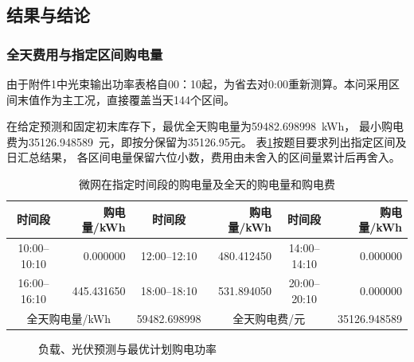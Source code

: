 \documentclass[UTF8,a4paper,12pt]{ctexart}
\newcommand{\Cost}{35126.948589}
\newcommand{\GridTotal}{59482.698998}
\begin{document}
\subsection{结果与结论}
\subsubsection{全天费用与指定区间购电量}
由于附件1中光束输出功率表格自00：10起，为省去对0:00重新测算。本问采用区间末值作为主工况，直接覆盖当天144个区间。

在给定预测和固定初末库存下，最优全天购电量为\GridTotal\ kWh，
最小购电费为\Cost\ 元，即按分保留为35126.95元。
表\ref{tab:purchase}按题目要求列出指定区间及日汇总结果，
各区间电量保留六位小数，费用由未舍入的区间量累计后再舍入。

\begin{table}[H]
  \centering\small
  \setlength{\tabcolsep}{4pt}
  \caption{微网在指定时间段的购电量及全天的购电量和购电费}\label{tab:purchase}
  \begin{tabular}{|c|r|c|r|c|r|}
    \hline
    时间段 & 购电量/kWh & 时间段 & 购电量/kWh & 时间段 & 购电量/kWh\\
    \hline
    10:00--10:10 & 0.000000 & 12:00--12:10 & 480.412450 & 14:00--14:10 & 0.000000\\
    \hline
    16:00--16:10 & 445.431650 & 18:00--18:10 & 531.894050 & 20:00--20:10 & 0.000000\\
    \hline
    \multicolumn{2}{|c|}{全天购电量/kWh} & \GridTotal
      & \multicolumn{2}{c|}{全天购电费/元} & \Cost\\
    \hline
  \end{tabular}
\end{table}

\begin{figure}[htbp]
  \centering
  \caption{负载、光伏预测与最优计划购电功率}\label{fig:power}
\end{figure}
\end{document}
